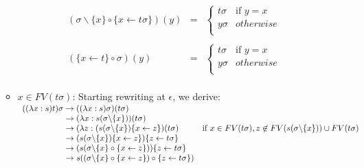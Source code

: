 \documentclass[a4paper]{article}
\newcommand{\fpsubstin}[1]{\{#1\}}
\newcommand{\fpscat}[0]{\circ}
\newcommand{\fpwith}{\leftarrow}
\newcommand{\fpwithoutset}[1]{\backslash\{#1\}}
\newcommand{\rewrites}[0]{\;\rightarrow\;}
\begin{document}
\begin{itemize}
\begin{itemize}
    \[
      \begin{array}{lcl}
        (\sigma\fpwithoutset{x} \fpscat \fpsubstin{x \fpwith t\sigma})(y)
        & = &
              \left\{
              \begin{array}{ll}
                t\sigma&\mbox{if }y=x\\
                y\sigma& otherwise\\
              \end{array}
        \right.
        \\\\
        (\fpsubstin{x \fpwith t} \fpscat \sigma) (y) &=&
                                                         \left\{
                                                         \begin{array}{ll}
                                                           t \sigma&\mbox{if }y=x\\
                                                           y \sigma & otherwise\\
                                                         \end{array}
        \right.\\
      \end{array}
    \]

  \item $x \in FV(t\sigma)$: Starting rewriting at $\epsilon$, we derive:\\
    $
    \begin{array}{r@{\rewrites}ll}
      ((\lambda x:s)t)\sigma & ((\lambda x:s)\sigma)(t\sigma) & \\
                             & (\lambda x : s(\sigma\fpwithoutset{x}))
                               (t\sigma) & \\
                             &  (\lambda z : (s(\sigma\fpwithoutset{x})
                               \fpsubstin{x \fpwith z} )(t\sigma)
                                                              & \mbox{if }x \in FV(t\sigma),
                                                                z \not \in FV(s(\sigma\fpwithoutset{x}))  \cup FV(t\sigma)\\
                             & (s(\sigma\fpwithoutset{x})
                               \fpsubstin{x \fpwith z} )\fpsubstin{z
                               \fpwith t\sigma} \\
                             & (s(\sigma\fpwithoutset{x} \fpscat
                               \fpsubstin{x \fpwith z} ))\fpsubstin{z
                               \fpwith t\sigma} \\
                             & s((\sigma\fpwithoutset{x} \fpscat
                               \fpsubstin{x \fpwith z}) \fpscat
                               \fpsubstin{z \fpwith t\sigma} ) \\
    \end{array}
    $


\end{itemize}
\end{itemize}
\end{document}

